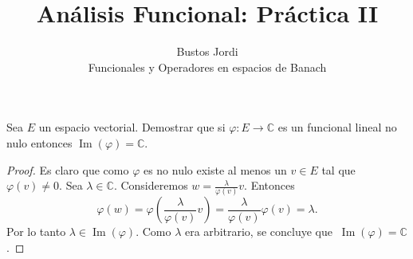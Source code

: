 \documentclass{article}
\theoremstyle{definition}
\newcommand{\C}{\mathbb{C}}
\newenvironment{ejercicio}[1]{\begin{trivlist}
\item[\hskip \labelsep {\bfseries Ejercicio}\hskip \labelsep {\bfseries #1.}]}{\end{trivlist}}
\begin{document}
\title{Análisis Funcional: Práctica II}
\author{Bustos Jordi\\Funcionales y Operadores en espacios de Banach}

\maketitle

\begin{ejercicio}{1}
    Sea \(E\) un espacio vectorial. Demostrar que si \( \varphi:E\to\C \) es un funcional lineal no nulo entonces \( \operatorname{Im}(\varphi)=\C \).
\end{ejercicio}
\begin{proof}
    Es claro que como \( \varphi \) es no nulo existe al menos un \(v \in E\) tal que \(\varphi(v) \neq 0\). Sea \( \lambda \in \C \). Consideremos \(w = \frac{\lambda}{\varphi(v)} v\). Entonces
    \[
        \varphi(w) = \varphi\left(\frac{\lambda}{\varphi(v)} v\right) = \frac{\lambda}{\varphi(v)} \varphi(v) = \lambda.
    \]
    Por lo tanto \(\lambda \in \operatorname{Im}(\varphi)\). Como \( \lambda \) era arbitrario, se concluye que \(\  \operatorname{Im}(\varphi) = \C \).
\end{proof}

\vspace{0.5cm}
\end{document}
